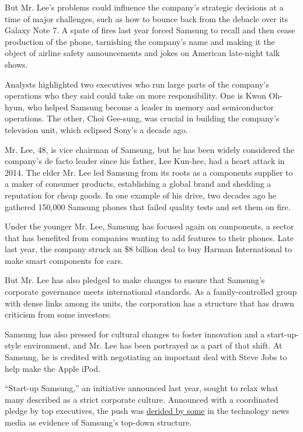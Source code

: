 But Mr. Lee's problems could influence the company's strategic decisions
at a time of major challenges, such as how to bounce back from the
debacle over its Galaxy Note 7. A spate of fires last year forced
Samsung to recall and then cease production of the phone, tarnishing the
company's name and making it the object of airline safety announcements
and jokes on American late-night talk shows.

Analysts highlighted two executives who run large parts of the company's
operations who they said could take on more responsibility. One is Kwon
Oh-hyun, who helped Samsung become a leader in memory and semiconductor
operations. The other, Choi Gee-sung, was crucial in building the
company's television unit, which eclipsed Sony's a decade ago.

Mr. Lee, 48, is vice chairman of Samsung, but he has been widely
considered the company's de facto leader since his father, Lee Kun-hee,
had a heart attack in 2014. The elder Mr. Lee led Samsung from its roots
as a components supplier to a maker of consumer products, establishing a
global brand and shedding a reputation for cheap goods. In one example
of his drive, two decades ago he gathered 150,000 Samsung phones that
failed quality tests and set them on fire.

Under the younger Mr. Lee, Samsung has focused again on components, a
sector that has benefited from companies wanting to add features to
their phones. Late last year, the company struck an \$8 billion deal to
buy Harman International to make smart components for cars.

But Mr. Lee has also pledged to make changes to ensure that Samsung's
corporate governance meets international standards. As a
family-controlled group with dense links among its units, the
corporation has a structure that has drawn criticism from some
investors.

Samsung has also pressed for cultural changes to foster innovation and a
start-up-style environment, and Mr. Lee has been portrayed as a part of
that shift. At Samsung, he is credited with negotiating an important
deal with Steve Jobs to help make the Apple iPod.

``Start-up Samsung,'' an initiative announced last year, sought to relax
what many described as a strict corporate culture. Announced with a
coordinated pledge by top executives, the push was
\href{https://www.techinasia.com/samsung-wants-to-be-a-startup}{derided
by some} in the technology news media as evidence of Samsung's top-down
structure.

